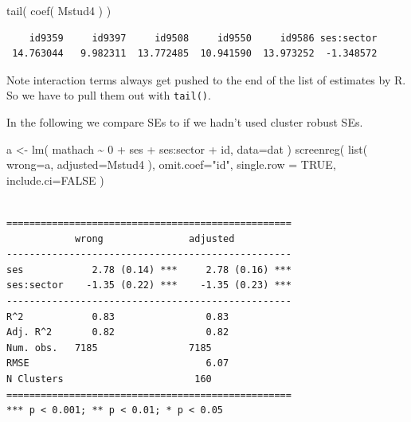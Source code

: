 \documentclass[
  letterpaper,
  DIV=11,
  numbers=noendperiod]{scrreprt}
\newenvironment{Shaded}{\begin{snugshade}}{\end{snugshade}}
\newcommand{\AttributeTok}[1]{\textcolor[rgb]{0.49,0.56,0.16}{#1}}
\newcommand{\ConstantTok}[1]{\textcolor[rgb]{0.53,0.00,0.00}{#1}}
\newcommand{\DecValTok}[1]{\textcolor[rgb]{0.25,0.63,0.44}{#1}}
\newcommand{\FunctionTok}[1]{\textcolor[rgb]{0.02,0.16,0.49}{#1}}
\newcommand{\NormalTok}[1]{\textcolor[rgb]{0.00,0.44,0.13}{#1}}
\newcommand{\OtherTok}[1]{\textcolor[rgb]{0.00,0.44,0.13}{#1}}
\newcommand{\SpecialCharTok}[1]{\textcolor[rgb]{0.25,0.44,0.63}{#1}}
\newcommand{\StringTok}[1]{\textcolor[rgb]{0.25,0.44,0.63}{#1}}
\begin{document}
\begin{Shaded}
\begin{Highlighting}[]
\FunctionTok{tail}\NormalTok{( }\FunctionTok{coef}\NormalTok{( Mstud4 ) )}
\end{Highlighting}
\end{Shaded}

\begin{verbatim}
    id9359     id9397     id9508     id9550     id9586 ses:sector 
 14.763044   9.982311  13.772485  10.941590  13.973252  -1.348572 
\end{verbatim}

Note interaction terms always get pushed to the end of the list of
estimates by R. So we have to pull them out with \texttt{tail()}.

In the following we compare SEs to if we hadn't used cluster robust SEs.

\begin{Shaded}
\begin{Highlighting}[]
\NormalTok{a }\OtherTok{\textless{}{-}} \FunctionTok{lm}\NormalTok{( mathach }\SpecialCharTok{\textasciitilde{}} \DecValTok{0} \SpecialCharTok{+}\NormalTok{ ses }\SpecialCharTok{+}\NormalTok{ ses}\SpecialCharTok{:}\NormalTok{sector }\SpecialCharTok{+}\NormalTok{ id, }
                    \AttributeTok{data=}\NormalTok{dat )}
\FunctionTok{screenreg}\NormalTok{( }\FunctionTok{list}\NormalTok{( }\AttributeTok{wrong=}\NormalTok{a, }\AttributeTok{adjusted=}\NormalTok{Mstud4 ), }
           \AttributeTok{omit.coef=}\StringTok{"id"}\NormalTok{, }\AttributeTok{single.row =} \ConstantTok{TRUE}\NormalTok{,}
           \AttributeTok{include.ci=}\ConstantTok{FALSE}\NormalTok{ )}
\end{Highlighting}
\end{Shaded}

\begin{verbatim}

==================================================
            wrong               adjusted          
--------------------------------------------------
ses            2.78 (0.14) ***     2.78 (0.16) ***
ses:sector    -1.35 (0.22) ***    -1.35 (0.23) ***
--------------------------------------------------
R^2            0.83                0.83           
Adj. R^2       0.82                0.82           
Num. obs.   7185                7185              
RMSE                               6.07           
N Clusters                       160              
==================================================
*** p < 0.001; ** p < 0.01; * p < 0.05
\end{verbatim}
\end{document}
